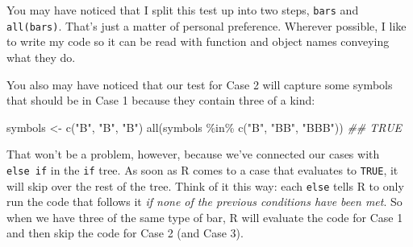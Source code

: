 \documentclass[
  letterpaper,
  DIV=11,
  numbers=noendperiod]{scrbook}
\newenvironment{Shaded}{\begin{snugshade}}{\end{snugshade}}
\newcommand{\CommentTok}[1]{\textcolor[rgb]{0.37,0.37,0.37}{#1}}
\newcommand{\ControlFlowTok}[1]{\textcolor[rgb]{0.00,0.23,0.31}{\textbf{#1}}}
\newcommand{\DecValTok}[1]{\textcolor[rgb]{0.68,0.00,0.00}{#1}}
\newcommand{\DocumentationTok}[1]{\textcolor[rgb]{0.37,0.37,0.37}{\textit{#1}}}
\newcommand{\FunctionTok}[1]{\textcolor[rgb]{0.28,0.35,0.67}{#1}}
\newcommand{\NormalTok}[1]{\textcolor[rgb]{0.00,0.23,0.31}{#1}}
\newcommand{\OtherTok}[1]{\textcolor[rgb]{0.00,0.23,0.31}{#1}}
\newcommand{\SpecialCharTok}[1]{\textcolor[rgb]{0.37,0.37,0.37}{#1}}
\newcommand{\StringTok}[1]{\textcolor[rgb]{0.13,0.47,0.30}{#1}}
\begin{document}
\begin{Shaded}
\end{Shaded}

You may have noticed that I split this test up into two steps,
\texttt{bars} and \texttt{all(bars)}. That's just a matter of personal
preference. Wherever possible, I like to write my code so it can be read
with function and object names conveying what they do.

You also may have noticed that our test for Case 2 will capture some
symbols that should be in Case 1 because they contain three of a kind:

\begin{Shaded}
\begin{Highlighting}[]
\NormalTok{symbols }\OtherTok{\textless{}{-}} \FunctionTok{c}\NormalTok{(}\StringTok{"B"}\NormalTok{, }\StringTok{"B"}\NormalTok{, }\StringTok{"B"}\NormalTok{)}
\FunctionTok{all}\NormalTok{(symbols }\SpecialCharTok{\%in\%} \FunctionTok{c}\NormalTok{(}\StringTok{"B"}\NormalTok{, }\StringTok{"BB"}\NormalTok{, }\StringTok{"BBB"}\NormalTok{))}
\DocumentationTok{\#\# TRUE}
\end{Highlighting}
\end{Shaded}

That won't be a problem, however, because we've connected our cases with
\texttt{else\ if} in the \texttt{if} tree. As soon as R comes to a case
that evaluates to \texttt{TRUE}, it will skip over the rest of the tree.
Think of it this way: each \texttt{else} tells R to only run the code
that follows it \emph{if none of the previous conditions have been met}.
So when we have three of the same type of bar, R will evaluate the code
for Case 1 and then skip the code for Case 2 (and Case 3).
\end{document}
